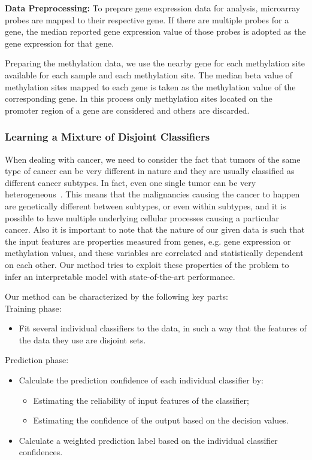 \textbf{Data Preprocessing:}
To prepare gene expression data for analysis, microarray probes are mapped to their respective gene. If there are multiple probes for a gene, the median reported gene expression value of those probes is adopted as the gene expression for that gene.

Preparing the methylation data, we use the nearby gene for each methylation site available for each sample and each methylation site. The median beta value of methylation sites mapped to each gene is taken as the methylation value of the corresponding gene. In this process only methylation sites located on the promoter region of a gene are considered and others are discarded.

\subsubsection{Learning a Mixture of Disjoint Classifiers}
When dealing with cancer, we need to consider the fact that tumors of the same type of cancer can be very different in nature and they are usually classified as different cancer subtypes. In fact, even one single tumor can be very heterogeneous~\cite{heppner1984tumor}. This means that the malignancies causing the cancer to happen are genetically different between subtypes, or even within subtypes, and it is possible to have multiple underlying cellular processes causing a particular cancer.
Also it is important to note that the nature of our given data is such that the input features are properties measured from genes, e.g. gene expression or methylation values, and these variables are correlated and statistically dependent on each other. Our method tries to exploit these properties of the problem to infer an interpretable model with state-of-the-art performance.

\noindent Our method can be characterized by the following key parts:\\

\noindent Training phase:
\begin{itemize}
\item Fit several individual classifiers to the data, in such a way that the features of the data they use are disjoint sets.
\end{itemize}
Prediction phase:
\begin{itemize}
\item Calculate the prediction confidence of each individual classifier by:
\begin{itemize}
\item Estimating the reliability of input features of the classifier;
\item Estimating the confidence of the output based on the decision values.
\end{itemize}
\item Calculate a weighted prediction label based on the individual classifier confidences.
\end{itemize}


